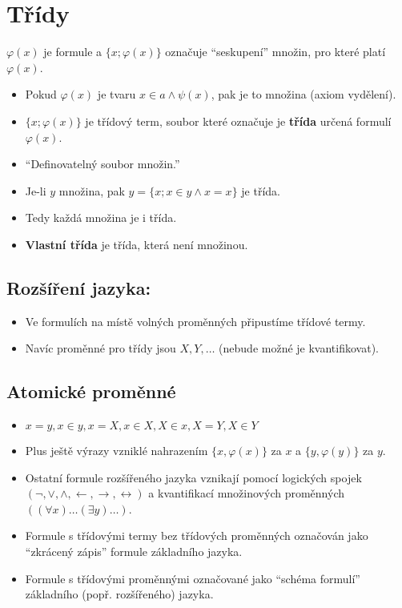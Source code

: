 \chapter{Třídy}

\begin{definice}
	$\varphi(x)$ je formule a $\{x; \varphi(x)\}$ označuje “seskupení” množin, pro které platí $\varphi(x)$.
\end{definice}

\begin{itemize}
	\item Pokud $\varphi(x)$ je tvaru $x \in a \land \psi(x)$, pak je to množina (axiom vydělení).
	\item $\{x; \varphi(x) \}$ je třídový term, soubor které označuje je \textbf{třída} určená formulí $\varphi(x)$.
	\item “Definovatelný soubor množin.”
	\item Je-li $y$ množina, pak $y = \{x; x \in y \land x = x\}$ je třída.
	\item Tedy každá množina je i třída.
	\item \textbf{Vlastní třída} je třída, která není množinou.
\end{itemize}

\section{Rozšíření jazyka:}

\begin{itemize}
	\item Ve formulích na místě volných proměnných připustíme třídové termy.
	\item Navíc proměnné pro třídy jsou $X,Y, \dots$ (nebude možné je kvantifikovat).
\end{itemize}

\section{Atomické proměnné}

\begin{itemize}
	\item $x = y, x \in y, x = X, x \in X, X \in x, X=Y, X \in Y$
	\item Plus ještě výrazy vzniklé nahrazením $\{x, \varphi(x)\}$ za $x$ a $\{y, \varphi(y)\}$ za $y$.
	\item Ostatní formule rozšířeného jazyka vznikají pomocí logických spojek $(\neg, \lor, \land, \leftarrow, \rightarrow, \leftrightarrow)$ a kvantifikací množinových proměnných $((\forall x)\dots(\exists y)\dots)$.
	\item Formule s třídovými termy bez třídových proměnných označován jako “zkrácený zápis” formule základního jazyka.
	\item Formule s třídovými proměnnými označované jako “schéma formulí” základního (popř. rozšířeného) jazyka.
\end{itemize}

